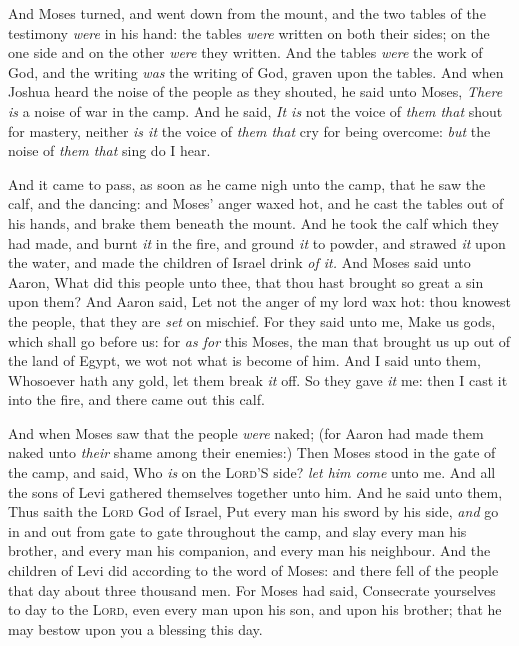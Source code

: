 \documentclass[11pt,letterpaper,oneside]{memoir}
\begin{document}
And Moses turned, and went down from the mount, and the two tables of
the testimony \emph{were} in his hand: the tables \emph{were} written on
both their sides; on the one side and on the other \emph{were} they
written. And the tables \emph{were} the work of God, and the writing
\emph{was} the writing of God, graven upon the tables. And when Joshua
heard the noise of the people as they shouted, he said unto Moses,
\emph{There is} a noise of war in the camp. And he said, \emph{It is} not the
voice of \emph{them that} shout for mastery, neither \emph{is it} the
voice of \emph{them that} cry for being overcome: \emph{but} the noise
of \emph{them that} sing do I hear.

And it came to pass, as soon as he came nigh unto the camp, that he saw
the calf, and the dancing: and Moses' anger waxed hot, and he cast the
tables out of his hands, and brake them beneath the mount. And he took
the calf which they had made, and burnt \emph{it} in the fire, and
ground \emph{it} to powder, and strawed \emph{it} upon the water, and
made the children of Israel drink \emph{of it. }And Moses said unto
Aaron, What did this people unto thee, that thou hast brought so great
a sin upon them? And Aaron said, Let not the anger of my lord wax hot:
thou knowest the people, that they are \emph{set} on mischief. For they
said unto me, Make us gods, which shall go before us: for \emph{as for}
this Moses, the man that brought us up out of the land of Egypt, we wot
not what is become of him. And I said unto them, Whosoever hath any
gold, let them break \emph{it} off. So they gave \emph{it} me: then I
cast it into the fire, and there came out this calf.

And when Moses saw that the people \emph{were} naked; (for Aaron had
made them naked unto \emph{their} shame among their enemies:) Then Moses
stood in the gate of the camp, and said, Who \emph{is} on the
\textsc{Lord}'S side? \emph{let him come} unto me. And all the sons of
Levi gathered themselves together unto him. And he said unto them, Thus
saith the \textsc{Lord} God of Israel, Put every man his sword by his
side, \emph{and} go in and out from gate to gate throughout the camp,
and slay every man his brother, and every man his companion, and every
man his neighbour. And the children of Levi did according to the word of
Moses: and there fell of the people that day about three thousand men.
For Moses had said, Consecrate yourselves to day to the \textsc{Lord},
even every man upon his son, and upon his brother; that he may bestow
upon you a blessing this day.
\end{document}
